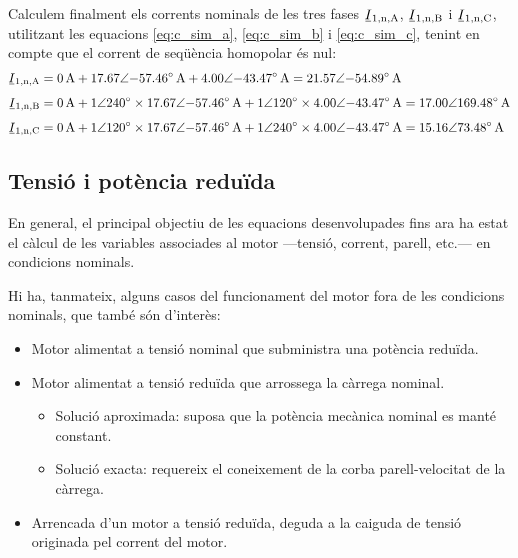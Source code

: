 \begin{exemple}
	Calculem finalment els corrents nominals de les tres fases $\cmplx{I}\ped{1,n,A}$, $\cmplx{I}\ped{1,n,B}$ i $\cmplx{I}\ped{1,n,C}$, utilitzant les equacions \eqref{eq:c_sim_a},
	\eqref{eq:c_sim_b} i \eqref{eq:c_sim_c}, tenint en compte que el corrent de seqüència homopolar és nul:
	\begin{align*}
		\cmplx{I}\ped{1,n,A} &= \qty{0}{A} + \complexqty{17,67:-57,46}{A} +
		\complexqty{4,00:-43,47}{A}  =
		\complexqty{21,57:-54,89}{A} \\[1ex]
		\cmplx{I}\ped{1,n,B} &= \qty{0}{A} + \complexnum{1:240} \times
		\complexqty{17,67:-57,46}{A} + \complexnum{1:120} \times
		\complexqty{4,00:-43,47}{A}  =
		\complexqty{17,00:169,48}{A}    \\[1ex]
		\cmplx{I}\ped{1,n,C} &= \qty{0}{A} + \complexnum{1:120} \times
		\complexqty{17,67:-57,46}{A} +
		\complexnum{1:240} \times \complexqty{4,00:-43,47}{A}  =
		\complexqty{15,16:73,48}{A}
\end{align*}
	
\end{exemple}
	

\subsection{Tensió i potència reduïda}\label{sec:mot-tens-pot-red}

En general, el principal objectiu de les equacions desenvolupades fins ara ha estat  el càlcul de les variables associades al motor ---tensió, corrent, parell, etc.--- en condicions nominals.

Hi ha, tanmateix, alguns casos del funcionament del motor fora de les condicions nominals, que també són d'interès: 
\begin{itemize}
	\item  Motor alimentat a tensió nominal que subministra una potència reduïda.
	\item  Motor alimentat a tensió reduïda que arrossega la càrrega nominal.
	\begin{itemize}
		\item Solució aproximada: suposa que la potència mecànica nominal es manté constant.
		\item Solució exacta: requereix el coneixement de la corba parell-velocitat de la càrrega.
	\end{itemize}	
	\item Arrencada d'un motor a tensió reduïda, deguda a la caiguda de tensió originada pel corrent  del motor.
\end{itemize}

